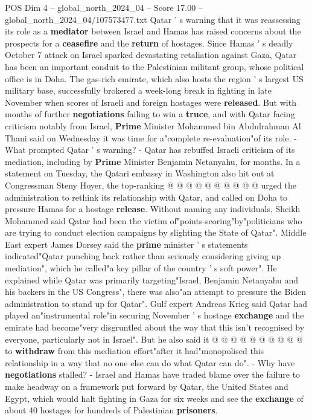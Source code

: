 \begin{textsample}{POS Dim 4 – global\_north\_2024\_04 – Score 17.00 – global\_north\_2024\_04/107573477.txt}  \label{ex:f4_pos_370}
Qatar ' s warning that it was reassessing its role as a \textbf{mediator} between Israel and Hamas has raised concerns about the prospects for a \textbf{ceasefire} and the \textbf{return} of hostages.
Since Hamas ' s deadly October 7 attack on Israel sparked devastating retaliation against Gaza, Qatar has been an important conduit to the Palestinian militant group, whose political office is in Doha.
The gas-rich emirate, which also hosts the region ' s largest US military base, successfully brokered a week-long break in fighting in late November when scores of Israeli and foreign hostages were \textbf{released}.
But with months of further \textbf{negotiations} failing to win a \textbf{truce}, and with Qatar facing criticism notably from Israel, \textbf{Prime} Minister Mohammed bin Abdulrahman Al Thani said on Wednesday it was time for a"complete re-evaluation"of its role. - What prompted Qatar ' s warning? - Qatar has rebuffed Israeli criticism of its mediation, including by \textbf{Prime} Minister Benjamin Netanyahu, for months.
In a statement on Tuesday, the Qatari embassy in Washington also hit out at Congressman Steny Hoyer, the top-ranking @ @ @ @ @ @ @ @ @ @ urged the administration to rethink its relationship with Qatar, and called on Doha to pressure Hamas for a hostage \textbf{release}.
Without naming any individuals, Sheikh Mohammed said Qatar had been the victim of"points-scoring"by"politicians who are trying to conduct election campaigns by slighting the State of Qatar".
Middle East expert James Dorsey said the \textbf{prime} minister ' s statements indicated"Qatar punching back rather than seriously considering giving up mediation", which he called"a key pillar of the country ' s soft power".
He explained while Qatar was primarily targeting"Israel, Benjamin Netanyahu and his backers in the US Congress", there was also"an attempt to pressure the Biden administration to stand up for Qatar".
Gulf expert Andreas Krieg said Qatar had played an"instrumental role"in securing November ' s hostage \textbf{exchange} and the emirate had become"very disgruntled about the way that this isn't recognised by everyone, particularly not in Israel".
But he also said it @ @ @ @ @ @ @ @ @ @ to \textbf{withdraw} from this mediation effort"after it had"monopolised this relationship in a way that no one else can do what Qatar can do". - Why have \textbf{negotiations} stalled? - Israel and Hamas have traded blame over the failure to make headway on a framework put forward by Qatar, the United States and Egypt, which would halt fighting in Gaza for six weeks and see the \textbf{exchange} of about 40 hostages for hundreds of Palestinian \textbf{prisoners}.

\end{textsample}
